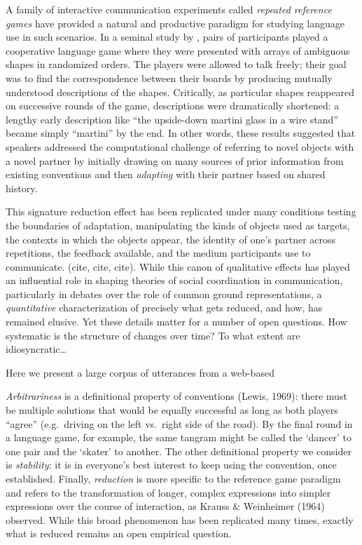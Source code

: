 A family of interactive communication experiments called \emph{repeated reference games} have provided a natural and productive paradigm for studying language use in such scenarios. In a seminal study by \cite{KraussWeinheimer64_ReferencePhrases}, pairs of participants played a cooperative language game where they were presented with arrays of ambiguous shapes in randomized orders. 
The players were allowed to talk freely; their goal was to find the correspondence between their boards by producing mutually understood descriptions of the shapes. 
Critically, as particular shapes reappeared on successive rounds of the game, descriptions were dramatically shortened: a lengthy early description like ``the upside-down martini glass in a wire stand'' became simply ``martini'' by the end. 
In other words, these results suggested that speakers addressed the computational challenge of referring to novel objects with a novel partner by initially drawing on many sources of prior information from existing conventions and then \emph{adapting} with their partner based on shared history.

This signature reduction effect has been replicated under many conditions testing the boundaries of adaptation, manipulating the kinds of objects used as targets, the contexts in which the objects appear, the identity of one's partner across repetitions, the feedback available, and the medium participants use to communicate. (cite, cite, cite). 
While this canon of qualitative effects has played an influential role in shaping theories of social coordination in communication, particularly in debates over the role of common ground representations, a \emph{quantitative} characterization of precisely what gets reduced, and how, has remained elusive. 
Yet these details matter for a number of open questions. 
How systematic is the structure of changes over time?
To what extent are idiosyncratic\dots
{}

Here we present a large corpus of utterances from a web-based 


\emph{Arbitrariness} is a definitional property of conventions (Lewis,
1969): there must be multiple solutions that would be equally successful
as long as both players ``agree'' (e.g.~driving on the left vs.~right
side of the road). By the final round in a language game, for example,
the same tangram might be called the `dancer' to one pair and the
`skater' to another. The other definitional property we consider is
\emph{stability}: it is in everyone's best interest to keep using the
convention, once established. Finally, \emph{reduction} is more specific
to the reference game paradigm and refers to the transformation of
longer, complex expressions into simpler expressions over the course of
interaction, as Krauss \& Weinheimer (1964) observed. While this broad
phenomenon has been replicated many times, exactly what is reduced
remains an open empirical question.

